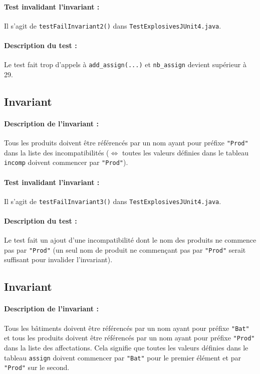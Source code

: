 \documentclass{article}
\begin{document}
\paragraph{Test invalidant l'invariant :} Il s'agit de \texttt{testFailInvariant2()} dans \texttt{TestExplosivesJUnit4.java}.

\vspace{-0.2cm}
\paragraph{Description du test :} Le test fait trop d'appels à \texttt{add\_assign(...)} et \texttt{nb\_assign} devient supérieur à 29. 

\subsection{Invariant }

\paragraph{Description de l'invariant :} Tous les produits doivent être référencés par un nom ayant pour préfixe \texttt{"Prod"} dans la liste des incompatibilités ($\Leftrightarrow$ toutes les valeurs définies dans le tableau \texttt{incomp} doivent commencer par \texttt{"Prod"}).

\vspace{-0.2cm}
\paragraph{Test invalidant l'invariant :} Il s'agit de \texttt{testFailInvariant3()} dans \texttt{TestExplosivesJUnit4.java}.

\vspace{-0.2cm}
\paragraph{Description du test :} Le test fait un ajout d'une incompatibilité dont le nom des produits ne commence pas par \texttt{"Prod"} (un seul nom de produit ne commençant pas par \texttt{"Prod"} serait suffisant pour invalider l'invariant).

\subsection{Invariant }

\paragraph{Description de l'invariant :} Tous les bâtiments doivent être référencés par un nom ayant pour préfixe \texttt{"Bat"} et tous les produits doivent être référencés par un nom ayant pour préfixe \texttt{"Prod"} dans la liste des affectations. Cela signifie que toutes les valeurs définies dans le tableau \texttt{assign} doivent commencer par \texttt{"Bat"} pour le premier élément et par \texttt{"Prod"} sur le second.
\end{document}
